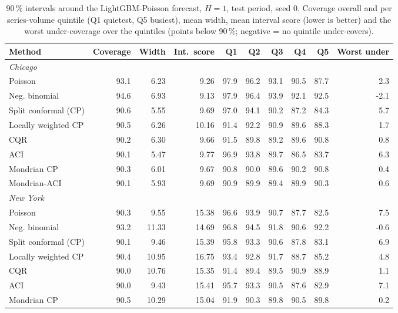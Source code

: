 \begin{table}[!htbp]\centering\scriptsize\setlength{\tabcolsep}{3.5pt}
\caption{90\,\% intervals around the LightGBM-Poisson forecast, $H=1$, test period, seed 0. Coverage overall and per series-volume quintile (Q1 quietest, Q5 busiest), mean width, mean interval score \citep{gneiting2007strictly} (lower is better) and the worst under-coverage over the quintiles (points below 90\,\%; negative = no quintile under-covers).}\label{tab:intervals}
\begin{adjustbox}{max width=\linewidth}\begin{tabular}{lrrrrrrrrr}\toprule
Method & Coverage & Width & Int.\ score & Q1 & Q2 & Q3 & Q4 & Q5 & Worst under\\\midrule
\multicolumn{10}{l}{\textit{Chicago}}\\
Poisson & 93.1 & 6.23 & 9.26 & 97.9 & 96.2 & 93.1 & 90.5 & 87.7 & 2.3 \\
Neg. binomial & 94.6 & 6.93 & 9.13 & 97.9 & 96.4 & 93.9 & 92.1 & 92.5 & -2.1 \\
Split conformal (CP) & 90.6 & 5.55 & 9.69 & 97.0 & 94.1 & 90.2 & 87.2 & 84.3 & 5.7 \\
Locally weighted CP & 90.5 & 6.26 & 10.16 & 91.4 & 92.2 & 90.9 & 89.6 & 88.3 & 1.7 \\
CQR & 90.2 & 6.30 & 9.66 & 91.5 & 89.8 & 89.2 & 89.6 & 90.8 & 0.8 \\
ACI & 90.1 & 5.47 & 9.77 & 96.9 & 93.8 & 89.7 & 86.5 & 83.7 & 6.3 \\
Mondrian CP & 90.3 & 6.01 & 9.67 & 90.8 & 90.0 & 89.6 & 90.2 & 90.8 & 0.4 \\
Mondrian-ACI & 90.1 & 5.93 & 9.69 & 90.9 & 89.9 & 89.4 & 89.9 & 90.3 & 0.6 \\
\midrule
\multicolumn{10}{l}{\textit{New York}}\\
Poisson & 90.3 & 9.55 & 15.38 & 96.6 & 93.9 & 90.7 & 87.7 & 82.5 & 7.5 \\
Neg. binomial & 93.2 & 11.33 & 14.69 & 96.8 & 94.5 & 91.8 & 90.6 & 92.2 & -0.6 \\
Split conformal (CP) & 90.1 & 9.46 & 15.39 & 95.8 & 93.3 & 90.6 & 87.8 & 83.1 & 6.9 \\
Locally weighted CP & 90.4 & 10.95 & 16.75 & 93.4 & 92.8 & 91.7 & 88.7 & 85.2 & 4.8 \\
CQR & 90.0 & 10.76 & 15.35 & 91.4 & 89.4 & 89.5 & 90.9 & 88.9 & 1.1 \\
ACI & 90.0 & 9.43 & 15.41 & 95.7 & 93.3 & 90.5 & 87.6 & 82.9 & 7.1 \\
Mondrian CP & 90.5 & 10.29 & 15.04 & 91.9 & 90.3 & 89.8 & 90.5 & 89.8 & 0.2 \\

\end{tabular}
\end{adjustbox}
\end{table}
